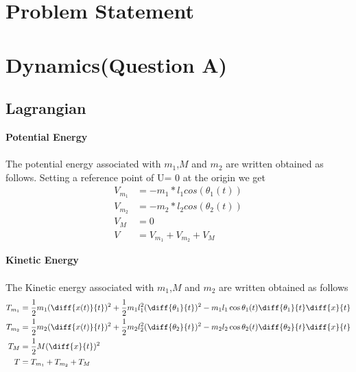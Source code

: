 \documentclass[12pt]{article}
\begin{document}

\tableofcontents
\pagebreak


\section{Problem Statement}


\section{Dynamics(Question A)}
\subsection{Lagrangian}  
\textbf{Potential Energy}  \\ \\
The potential energy associated with $m_1$,$M$ and $m_2$ are written obtained as follows.
Setting a reference point of U= 0 at the origin  we get
\begin{align} 
  V_{m_1} &= -m_1*l_1cos(\theta _1(t)) \\
  V_{m_2} &= -m_2*l_2cos(\theta _2(t)) \\
  V_M &=0 \\
  V &= V_{m_1} +V_{m_2} + V_M
\end{align}


\textbf{Kinetic Energy}  \\ \\
The Kinetic energy associated with $m_1$,$M$ and $m_2$ are written obtained as follows
\begin{align}   
  T_{m_1} &= \frac{1}{2}m_1(\diff{x(t)}{t})^2 + \frac{1}{2}m_1l_1^2(\diff{\theta _1}{t})^2 -m_1l_1\cos \theta _1(t) \diff{\theta _1}{t} \diff{x}{t}\\
  T_{m_2} &= \frac{1}{2}m_2(\diff{x(t)}{t})^2 + \frac{1}{2}m_2l_2^2(\diff{\theta _2}{t})^2 -m_2l_2\cos \theta _2(t) \diff{\theta _2}{t} \diff{x}{t}\\
  T_M &= \frac{1}{2}M(\diff{x}{t})^2 \\
  T &= T_{m_1} +T_{m_2} + T_M 
\end{align}
\end{document}
